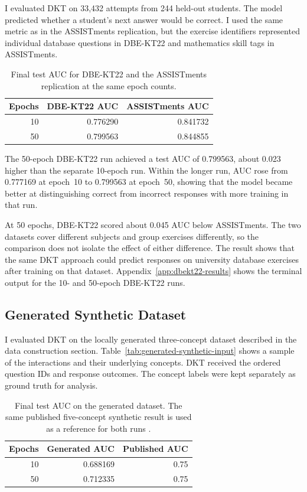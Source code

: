 \documentclass[11pt]{article}
\begin{document}
I evaluated DKT on 33,432 attempts from 244 held-out students.
The model predicted whether a student's next answer would be correct.
I used the same metric as in the ASSISTments replication, but the
exercise identifiers represented individual database questions in
DBE-KT22 and mathematics skill tags in ASSISTments.

\begin{table}[H]
\centering
\small
\begin{tabular}{@{}rrr@{}}
\hline
Epochs & DBE-KT22 AUC & ASSISTments AUC \\
\hline
10 & 0.776290 & 0.841732 \\
50 & 0.799563 & 0.844855 \\
\hline
\end{tabular}
\caption{Final test AUC for DBE-KT22 and the ASSISTments replication
at the same epoch counts.}
\label{tab:dbekt22-results}
\end{table}

The 50-epoch DBE-KT22 run achieved a test AUC of 0.799563, about
0.023 higher than the separate 10-epoch run. Within the longer run,
AUC rose from 0.777169 at epoch~10 to 0.799563 at epoch~50, showing
that the model became better at distinguishing correct from
incorrect responses with more training in that run.

At 50 epochs, DBE-KT22 scored about 0.045 AUC below ASSISTments.
The two datasets cover different subjects and group exercises
differently, so the comparison does not isolate the effect of either
difference. The result shows that the same DKT approach could
predict responses on university database exercises after training
on that dataset.
Appendix~\ref{app:dbekt22-results} shows the terminal output for
the 10- and 50-epoch DBE-KT22 runs.


\subsection{Generated Synthetic Dataset}

I evaluated DKT on the locally generated three-concept dataset
described in the data construction section.
Table~\ref{tab:generated-synthetic-input} shows a sample of the
interactions and their underlying concepts. DKT received the ordered
question IDs and response outcomes. The concept labels were kept
separately as ground truth for analysis.

\begin{table}[H]
\centering
\small
\begin{tabular}{@{}rrr@{}}
\hline
Epochs & Generated AUC & Published AUC \\
\hline
10 & 0.688169 & 0.75 \\
50 & 0.712335 & 0.75 \\
\hline
\end{tabular}
\caption{Final test AUC on the generated dataset. The same published
five-concept synthetic result is used as a reference for both runs
\citep{piech2015deep}.}
\label{tab:generated-synthetic-results}
\end{table}
\end{document}
